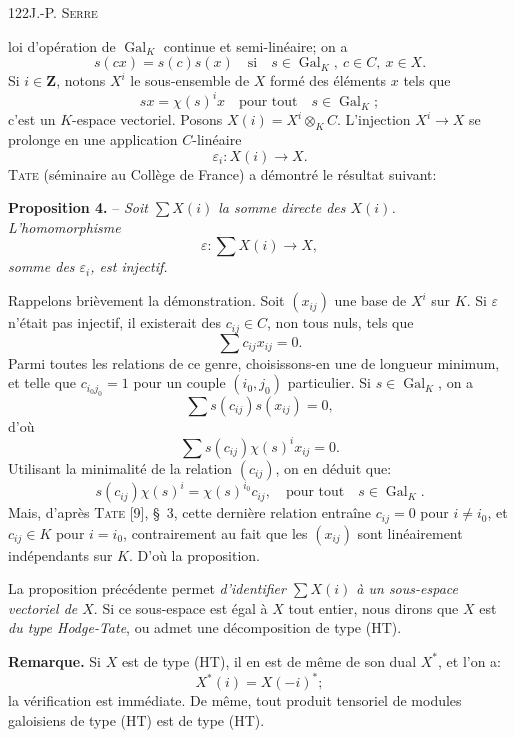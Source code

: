 122\hfill J.-P. \textsc{Serre}

loi d'opération de $\operatorname{Gal}_K$ continue et semi-linéaire; on a
\[
s(cx)=s(c)s(x)\quad\text{si}\quad s\in\operatorname{Gal}_K,\ c\in C,\ x\in X.
\]
Si $i\in\mathbf Z$, notons $X^i$ le sous-ensemble de $X$ formé des éléments $x$ tels que
\[
sx=\chi(s)^i x\quad\text{pour tout}\quad s\in\operatorname{Gal}_K;
\]
c'est un $K$-espace vectoriel. Posons $X(i)=X^i\otimes_K C$. L'injection $X^i\to X$ se prolonge en une application $C$-linéaire
\[
\varepsilon_i:X(i)\to X.
\]
\textsc{Tate} (séminaire au Collège de France) a démontré le résultat suivant:

\textbf{Proposition 4.} -- \textit{Soit $\sum X(i)$ la somme directe des $X(i)$. L'homomorphisme}
\[
\varepsilon:\sum X(i)\to X,
\]
\textit{somme des $\varepsilon_i$, est injectif.}

Rappelons brièvement la démonstration. Soit $(x_{ij})$ une base de $X^i$ sur $K$. Si $\varepsilon$ n'était pas injectif, il existerait des $c_{ij}\in C$, non tous nuls, tels que
\[
\sum c_{ij}x_{ij}=0.
\]
Parmi toutes les relations de ce genre, choisissons-en une de longueur minimum, et telle que $c_{i_0j_0}=1$ pour un couple $(i_0,j_0)$ particulier. Si $s\in\operatorname{Gal}_K$, on a
\[
\sum s(c_{ij})s(x_{ij})=0,
\]
d'où
\[
\sum s(c_{ij})\chi(s)^i x_{ij}=0.
\]
Utilisant la minimalité de la relation $(c_{ij})$, on en déduit que:
\[
s(c_{ij})\chi(s)^i=\chi(s)^{i_0}c_{ij},\quad\text{pour tout}\quad s\in\operatorname{Gal}_K.
\]
Mais, d'après \textsc{Tate} [9], \S\ 3, cette dernière relation entraîne $c_{ij}=0$ pour $i\neq i_0$, et $c_{ij}\in K$ pour $i=i_0$, contrairement au fait que les $(x_{ij})$ sont linéairement indépendants sur $K$. D'où la proposition.

La proposition précédente permet \textit{d'identifier $\sum X(i)$ à un sous-espace vectoriel de $X$}. Si ce sous-espace est égal à $X$ tout entier, nous dirons que $X$ est \textit{du type Hodge-Tate}, ou admet une décomposition de type (HT).

\textbf{Remarque.} Si $X$ est de type (HT), il en est de même de son dual $X^*$, et l'on a:
\[
X^*(i)=X(-i)^*;
\]
la vérification est immédiate. De même, tout produit tensoriel de modules galoisiens de type (HT) est de type (HT).
